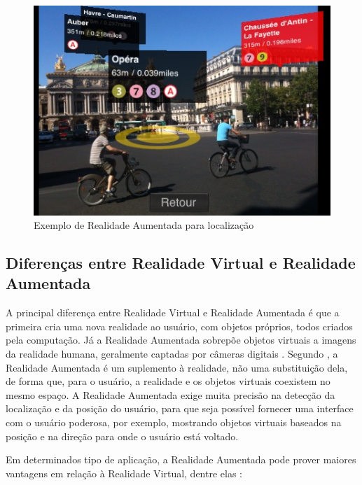 \begin{figure}[h!]
    \centering
    \caption{Exemplo de Realidade Aumentada para localização}
    \label{fig:AR-map-locations11}
    \includegraphics[width=15cm]{resources/augmented-reality-paris.jpg}
\end{figure}



\subsection{Diferenças entre Realidade Virtual e Realidade Aumentada}

A principal diferença entre Realidade Virtual e Realidade Aumentada
é que a primeira cria uma nova realidade ao usuário, com objetos
próprios, todos criados pela computação. Já a Realidade Aumentada
sobrepõe objetos virtuais a imagens da realidade humana, geralmente
captadas por câmeras digitais \cite{ARCADE, TrendsInAR}.
Segundo \cite{SurveyAR, AdvancesAR}, a Realidade Aumentada é
um suplemento à realidade, não uma substituição dela, de forma que,
para o usuário, a realidade e os objetos virtuais coexistem no mesmo
espaço. A Realidade Aumentada exige muita precisão na detecção da
localização e da posição do usuário, para que seja possível fornecer
uma interface com o usuário poderosa, por exemplo, mostrando objetos
virtuais baseados na posição e na direção para onde o usuário está
voltado.

Em determinados tipo de aplicação, a Realidade Aumentada pode prover maiores vantagens em 
relação à Realidade Virtual, dentre elas \cite{ARFeatureMaching}:

